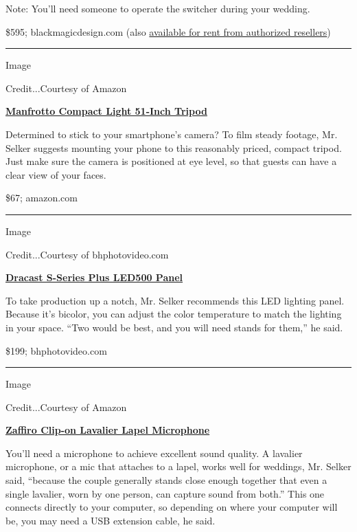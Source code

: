 Note: You'll need someone to operate the switcher during your wedding.

\$595; blackmagicdesign.com (also
\href{https://www.blackmagicdesign.com/products/atemmini/howtobuy/}{available
for rent from authorized resellers})

\begin{center}\rule{0.5\linewidth}{\linethickness}\end{center}

Image

Credit...Courtesy of Amazon

\textbf{\href{https://www.amazon.com/dp/B07JN5Q1D3/ref=twister_B07PW2QDF8}{Manfrotto
Compact Light 51-Inch Tripod}}

Determined to stick to your smartphone's camera? To film steady footage,
Mr. Selker suggests mounting your phone to this reasonably priced,
compact tripod. Just make sure the camera is positioned at eye level, so
that guests can have a clear view of your faces.

\$67; amazon.com

\begin{center}\rule{0.5\linewidth}{\linethickness}\end{center}

Image

Credit...Courtesy of bhphotovideo.com

\textbf{\href{https://www.bhphotovideo.com/c/product/1367520-REG/dracast_drsppl500bn_s_series_led500_plus.html}{Dracast
S-Series Plus LED500 Panel}}

To take production up a notch, Mr. Selker recommends this LED lighting
panel. Because it's bicolor, you can adjust the color temperature to
match the lighting in your space. ``Two would be best, and you will need
stands for them,'' he said.

\$199; bhphotovideo.com

\begin{center}\rule{0.5\linewidth}{\linethickness}\end{center}

Image

Credit...Courtesy of Amazon

\textbf{\href{https://www.amazon.com/Microphone-ZAFFIRO-Omnidirectional-Recording-Podcasting/dp/B081R45D2X/ref=sr_1_6?dchild=1\&keywords=usb+lavalier\&qid=1592858828\&s=electronics\&sr=1-6}{Zaffiro
Clip-on Lavalier Lapel Microphone}}

You'll need a microphone to achieve excellent sound quality. A lavalier
microphone, or a mic that attaches to a lapel, works well for weddings,
Mr. Selker said, ``because the couple generally stands close enough
together that even a single lavalier, worn by one person, can capture
sound from both.'' This one connects directly to your computer, so
depending on where your computer will be, you may need a USB extension
cable, he said.

